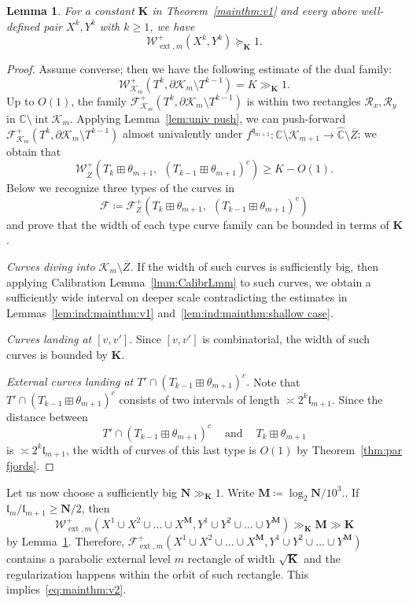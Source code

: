 \documentclass{amsart}
\renewcommand{\sp}{{\ \ }}
\newcommand{\1}{{\mathbb 1 }}
\newcommand{\ext}{{\operatorname{ext}}}
\newcommand{\Fam}{{\mathcal F}}
\newcommand{\Width}{{\mathcal W}}
\newcommand\RR{\mathcal{R}}
\newcommand\intr{\operatorname{int}}
\newcommand{\bN}{{\mathbf N}}
\newcommand{\bM}{{\mathbf M}}
\newcommand{\bK}{{\mathbf K}}
\newcommand{\qq}{\mathfrak{q}}
\newcommand{\length}{{\mathfrak l}}
\newcommand{\wC}{\widehat{\mathbb{C}}}
\newcommand{\C}{\mathbb{C}}
\newtheorem{lem}[thm]{Lemma}
\theoremstyle{remark}
\numberwithin{equation}{section}
\theoremstyle{definition}
\newcommand{\filled}{{\mathcal {K} }}
\begin{document}
\begin{lem}
\label{lem:est for bN}
For a constant $\bK$ in Theorem~\ref{mainthm:v1} and every above well-defined pair $X^k, Y^k$ with $k\ge 1$, we have
\[\Width^+_{\ext,m} (X^k,Y^k)\succeq_{\bK} 1.\]
\end{lem}
\begin{proof}
Assume converse; then we have the following estimate of the dual family:
\[\Width^+_{\filled_{m}} (T^k, \partial \filled_{m}\setminus T^{k-1})=K\gg_\bK 1.\]
Up to $O(1)$, the family $\Fam^+_{\filled_{m}} (T^k, \partial \filled_{m}\setminus T^{k-1})$  is within two rectangles $\RR_x,\RR_y$ in $\C\setminus \intr \filled_m$. Applying Lemma~\ref{lem:univ push}, we can push-forward $\Fam^+_{\filled_{m}} (T^k, \partial \filled_{m}\setminus T^{k-1})$ almost univalently under $f^{\qq_{m+1}}\colon \wC\setminus \filled_{m+1}\to \wC\setminus \overline Z$; we obtain that
\[\Width^+_{\overline Z}(T_k\boxplus \theta_{m+1}, \sp (T_{k-1}\boxplus \theta_{m+1})^c)\ge K-O(1).\]
Below we recognize three types of the curves in \[\Fam\coloneqq \Fam^+_{Z}(T_k\boxplus \theta_{m+1}, \sp (T_{k-1}\boxplus \theta_{m+1})^c)\] and prove that the width of each type curve family can be bounded in terms of $\bK$.

\emph{Curves diving into $\filled_{m}\setminus \overline Z$.} If the width of such curves is sufficiently big, then applying Calibration Lemma~\ref{lmm:CalibrLmm} to such curves, we obtain a sufficiently wide interval on deeper scale contradicting the estimates in Lemmas~\ref{lem:ind:mainthm:v1} and~\ref{lem:ind:mainthm:shallow case}.

\emph{Curves landing at $[v,v']$.} Since $[v,v']$ is combinatorial, the width of such curves is bounded by $\bK$.

\emph{External curves landing at $T'\cap (T_{k-1}\boxplus \theta_{m+1})^c$.} Note that $T'\cap (T_{k-1}\boxplus \theta_{m+1})^c$ consists of two intervals of length $\asymp 2^k\length_{m+1}$. Since the distance between \[T'\cap (T_{k-1}\boxplus \theta_{m+1})^c\sp\sp\text{ and }\sp\sp T_k\boxplus \theta_{m+1}\] is $\asymp 2^k\length_{m+1}$, the width of curves of this last type is $O(1)$ by Theorem~\ref{thm:par fjords}.
\end{proof}

Let us now choose a sufficiently big $\bN\gg_{\bK} 1$. Write $\bM\coloneqq \log_2 \bN/10^3. $. If $\length_{m}/\length_{m+1}\ge \bN/2$, then 
\[\Width^+_{\ext,m}(X^1\cup X^2\cup\dots \cup X^{\bM}, Y^1\cup Y^2\cup\dots \cup Y^{\bM}) \gg_\bK \bM \gg \bK\] by Lemma~\ref{lem:est for bN}.
Therefore, $\Fam^+_{\ext,m}(X^1\cup X^2\cup\dots \cup X^{\bM}, Y^1\cup Y^2\cup\dots \cup Y^{\bM})$ contains a parabolic external level $m$ rectangle of width $\sqrt{\bK}$ and the regularization happens within the orbit of such rectangle. This implies~\eqref{eq:mainthm:v2}. 
\end{document}
